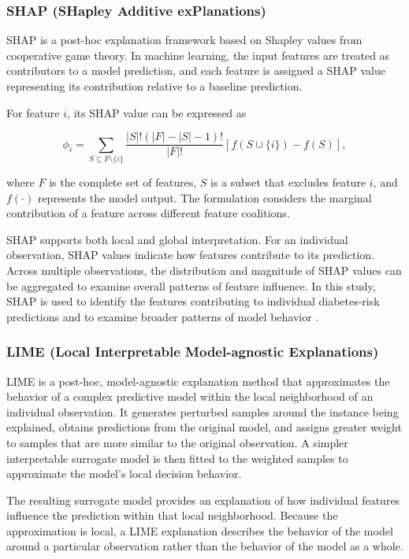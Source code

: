 \subsubsection{SHAP (SHapley Additive exPlanations)}

SHAP is a post-hoc explanation framework based on Shapley values from
cooperative game theory. In machine learning, the input features are treated
as contributors to a model prediction, and each feature is assigned a SHAP
value representing its contribution relative to a baseline prediction.

For feature $i$, its SHAP value can be expressed as

\begin{equation}
\phi_i =
\sum_{S \subseteq F \setminus \{i\}}
\frac{|S|!(|F|-|S|-1)!}{|F|!}
\left[
f(S \cup \{i\})-f(S)
\right],
\end{equation}

where $F$ is the complete set of features, $S$ is a subset that excludes
feature $i$, and $f(\cdot)$ represents the model output. The formulation
considers the marginal contribution of a feature across different feature
coalitions.

SHAP supports both local and global interpretation. For an individual
observation, SHAP values indicate how features contribute to its prediction.
Across multiple observations, the distribution and magnitude of SHAP values
can be aggregated to examine overall patterns of feature influence. In this study, SHAP is used to identify the features contributing to individual
diabetes-risk predictions and to examine broader patterns of model behavior
\cite{du_gdm_shap_2022, mao_diabetes_ml_2023}.

\subsubsection{LIME (Local Interpretable Model-agnostic Explanations)}

LIME is a post-hoc, model-agnostic explanation method that approximates the
behavior of a complex predictive model within the local neighborhood of an
individual observation. It generates perturbed samples around the instance
being explained, obtains predictions from the original model, and assigns
greater weight to samples that are more similar to the original observation.
A simpler interpretable surrogate model is then fitted to the weighted
samples to approximate the model's local decision behavior.

The resulting surrogate model provides an explanation of how individual
features influence the prediction within that local neighborhood. Because
the approximation is local, a LIME explanation describes the behavior of
the model around a particular observation rather than the behavior of the
model as a whole.


